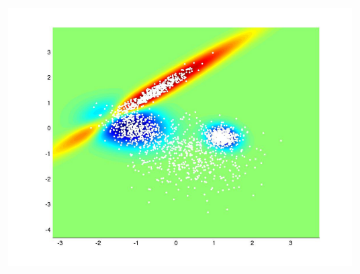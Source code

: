 \documentclass[useAMS,usenatbib,fleqn]{mn2e}
\begin{document}
\begin{figure}
\begin{subfigure}[b]{90 px}
                \includegraphics[trim = 150px 100px 150px 70px, clip=true,width=\textwidth]{VC3.jpg}
        \end{subfigure}
       

\end{figure}
\end{document}
